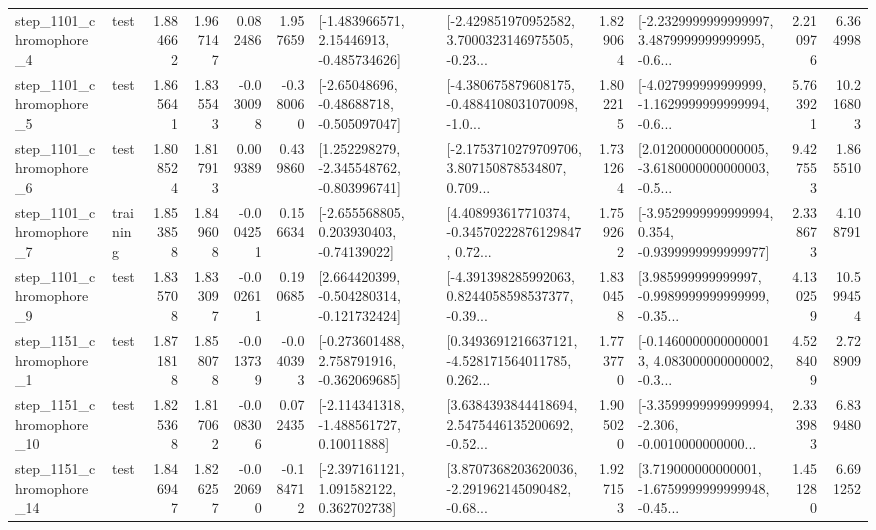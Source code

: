 \begin{tabular}{llrrrrllrlrr}
  step\_1101\_chromophore\_4 &      test &      1.884662 &    1.967147 &      0.082486 &  1.957659 &    [-1.483966571, 2.15446913, -0.485734626] &  [-2.429851970952582, 3.7000323146975505, -0.23... &       1.829064 &  [-2.2329999999999997, 3.4879999999999995, -0.6... &            2.210976 &          6.364998 \\
  step\_1101\_chromophore\_5 &      test &      1.865641 &    1.835543 &     -0.030098 & -0.380060 &    [-2.65048696, -0.48688718, -0.505097047] &  [-4.380675879608175, -0.4884108031070098, -1.0... &       1.802215 &  [-4.027999999999999, -1.1629999999999994, -0.6... &            5.763921 &         10.216803 \\
  step\_1101\_chromophore\_6 &      test &      1.808524 &    1.817913 &      0.009389 &  0.439860 &   [1.252298279, -2.345548762, -0.803996741] &  [-2.1753710279709706, 3.807150878534807, 0.709... &       1.731264 &  [2.0120000000000005, -3.6180000000000003, -0.5... &            9.427553 &          1.865510 \\
  step\_1101\_chromophore\_7 &  training &      1.853858 &    1.849608 &     -0.004251 &  0.156634 &    [-2.655568805, 0.203930403, -0.74139022] &  [4.408993617710374, -0.34570222876129847, 0.72... &       1.759262 &  [-3.9529999999999994, 0.354, -0.9399999999999977] &            2.338673 &          4.108791 \\
  step\_1101\_chromophore\_9 &      test &      1.835708 &    1.833097 &     -0.002611 &  0.190685 &   [2.664420399, -0.504280314, -0.121732424] &  [-4.391398285992063, 0.8244058598537377, -0.39... &       1.830458 &  [3.985999999999997, -0.9989999999999999, -0.35... &            4.130259 &         10.599454 \\
  step\_1151\_chromophore\_1 &      test &      1.871818 &    1.858078 &     -0.013739 & -0.040393 &   [-0.273601488, 2.758791916, -0.362069685] &  [0.3493691216637121, -4.528171564011785, 0.262... &       1.773770 &  [-0.14600000000000013, 4.083000000000002, -0.3... &            4.528409 &          2.728909 \\
 step\_1151\_chromophore\_10 &      test &      1.825368 &    1.817062 &     -0.008306 &  0.072435 &    [-2.114341318, -1.488561727, 0.10011888] &  [3.6384393844418694, 2.5475446135200692, -0.52... &       1.905020 &  [-3.3599999999999994, -2.306, -0.0010000000000... &            2.333983 &          6.839480 \\
 step\_1151\_chromophore\_14 &      test &      1.846947 &    1.826257 &     -0.020690 & -0.184712 &    [-2.397161121, 1.091582122, 0.362702738] &  [3.8707368203620036, -2.291962145090482, -0.68... &       1.927153 &  [3.719000000000001, -1.6759999999999948, -0.45... &            1.451280 &          6.691252 \\

\end{tabular}
